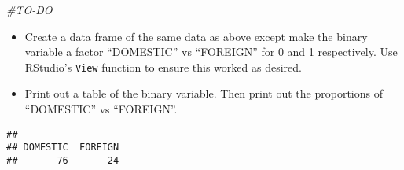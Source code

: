 \documentclass[
]{article}
\newenvironment{Shaded}{\begin{snugshade}}{\end{snugshade}}
\newcommand{\AttributeTok}[1]{\textcolor[rgb]{0.77,0.63,0.00}{#1}}
\newcommand{\CommentTok}[1]{\textcolor[rgb]{0.56,0.35,0.01}{\textit{#1}}}
\newcommand{\DecValTok}[1]{\textcolor[rgb]{0.00,0.00,0.81}{#1}}
\newcommand{\FunctionTok}[1]{\textcolor[rgb]{0.00,0.00,0.00}{#1}}
\newcommand{\NormalTok}[1]{#1}
\newcommand{\OtherTok}[1]{\textcolor[rgb]{0.56,0.35,0.01}{#1}}
\newcommand{\SpecialCharTok}[1]{\textcolor[rgb]{0.00,0.00,0.00}{#1}}
\newcommand{\StringTok}[1]{\textcolor[rgb]{0.31,0.60,0.02}{#1}}
\providecommand{\tightlist}{%
  \setlength{\itemsep}{0pt}\setlength{\parskip}{0pt}}
\begin{document}
\begin{Shaded}
\begin{Highlighting}[]
\CommentTok{\#TO{-}DO}
\end{Highlighting}
\end{Shaded}

\begin{itemize}
\tightlist
\item
  Create a data frame of the same data as above except make the binary
  variable a factor ``DOMESTIC'' vs ``FOREIGN'' for 0 and 1
  respectively. Use RStudio's \texttt{View} function to ensure this
  worked as desired.
\end{itemize}

\begin{Shaded}
\end{Shaded}

\begin{itemize}
\tightlist
\item
  Print out a table of the binary variable. Then print out the
  proportions of ``DOMESTIC'' vs ``FOREIGN''.
\end{itemize}

\begin{Shaded}
\end{Shaded}

\begin{verbatim}
## 
## DOMESTIC  FOREIGN 
##       76       24
\end{verbatim}

\begin{Shaded}
\end{Shaded}
\end{document}
